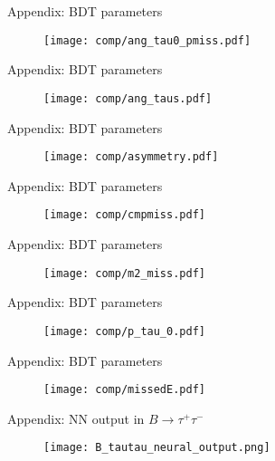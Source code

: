 \begin{frame}{Appendix: BDT parameters}
    \begin{figure}
        \centering
        \texttt{[image: comp/ang\_tau0\_pmiss.pdf]}
    \end{figure}     
\end{frame}

\begin{frame}{Appendix: BDT parameters}
    \begin{figure}
        \centering
        \texttt{[image: comp/ang\_taus.pdf]}
    \end{figure}     
\end{frame}

\begin{frame}{Appendix: BDT parameters}    
    \begin{figure}
        \centering
        \texttt{[image: comp/asymmetry.pdf]}
    \end{figure}     
\end{frame}

\begin{frame}{Appendix: BDT parameters}   
    \begin{figure}
        \centering
        \texttt{[image: comp/cmpmiss.pdf]}
    \end{figure}     
\end{frame}

\begin{frame}{Appendix: BDT parameters}    
    \begin{figure}
        \centering
        \texttt{[image: comp/m2\_miss.pdf]}
    \end{figure}     
\end{frame}

\begin{frame}{Appendix: BDT parameters}    
    \begin{figure}
        \centering
        \texttt{[image: comp/p\_tau\_0.pdf]}
    \end{figure}     
\end{frame}

\begin{frame}{Appendix: BDT parameters}    
    \begin{figure}
        \centering
        \texttt{[image: comp/missedE.pdf]}
    \end{figure}     
\end{frame}

\begin{frame}{Appendix: NN output in $B \to \tau^+ \tau^-$}
    \begin{figure}
        \centering
        \texttt{[image: B\_tautau\_neural\_output.png]}
    \end{figure}
\end{frame}
    
